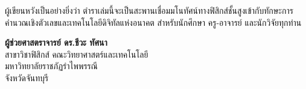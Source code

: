 ผู้เขียนหวังเป็นอย่างยิ่งว่า ตำราเล่มนี้จะเป็นสะพานเชื่อมมโนทัศน์ทางฟิสิกส์ชั้นสูงเข้ากับทักษะการคำนวณเชิงตัวเลขและเทคโนโลยีดิจิทัลแห่งอนาคต สำหรับนักศึกษา ครู-อาจารย์ และนักวิจัยทุกท่าน

\vspace{1.5cm}
\begin{flushright}
    \textbf{ผู้ช่วยศาสตราจารย์ ดร.ชีวะ ทัศนา}\\
    สาขาวิชาฟิสิกส์ คณะวิทยาศาสตร์และเทคโนโลยี\\
    มหาวิทยาลัยราชภัฏรำไพพรรณี\\
    จังหวัดจันทบุรี
\end{flushright}
